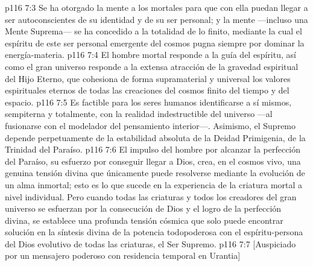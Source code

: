 \vs p116 7:3 Se ha otorgado la mente a los mortales para que con ella puedan llegar a ser autoconscientes de su identidad y de su ser personal; y la mente ---incluso una Mente Suprema--- se ha concedido a la totalidad de lo finito, mediante la cual el espíritu de este ser personal emergente del cosmos pugna siempre por dominar la energía\hyp{}materia.
\vs p116 7:4 El hombre mortal responde a la guía del espíritu, así como el gran universo responde a la extensa atracción de la gravedad espiritual del Hijo Eterno, que cohesiona de forma supramaterial y universal los valores espirituales eternos de todas las creaciones del cosmos finito del tiempo y del espacio.
\vs p116 7:5 Es factible para los seres humanos identificarse a sí mismos, sempiterna y totalmente, con la realidad indestructible del universo ---al fusionarse con el modelador del pensamiento interior---. Asimismo, el Supremo depende perpetuamente de la estabilidad absoluta de la Deidad Primigenia, de la Trinidad del Paraíso.
\vs p116 7:6 El impulso del hombre por alcanzar la perfección del Paraíso, su esfuerzo por conseguir llegar a Dios, crea, en el cosmos vivo, una genuina tensión divina que únicamente puede resolverse mediante la evolución de un alma inmortal; esto es lo que sucede en la experiencia de la criatura mortal a nivel individual. Pero cuando todas las criaturas y todos los creadores del gran universo se esfuerzan por la consecución de Dios y el logro de la perfección divina, se establece una profunda tensión cósmica que solo puede encontrar solución en la síntesis divina de la potencia todopoderosa con el espíritu\hyp{}persona del Dios evolutivo de todas las criaturas, el Ser Supremo.
\vsetoff
\vs p116 7:7 [Auspiciado por un mensajero poderoso con residencia temporal en Urantia]
